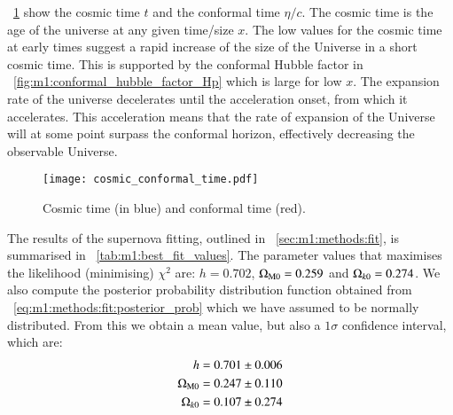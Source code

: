     ~\cref{fig:m1:cosmic_conformal_time} show the cosmic time $t$ and the conformal time $\eta/c$. The cosmic time is the age of the universe at any given time/size $x$. The low values for the cosmic time at early times suggest a rapid increase of the size of the Universe in a short cosmic time. This is supported by the conformal Hubble factor in ~\cref{fig:m1:conformal_hubble_factor_Hp} which is large for low $x$. The expansion rate of the universe decelerates until the acceleration onset, from which it accelerates. This acceleration means that the rate of expansion of the Universe will at some point surpass the conformal horizon, effectively decreasing the observable Universe. 

    \begin{figure}
        \texttt{[image: cosmic\_conformal\_time.pdf]}
        \caption{Cosmic time (in blue) and conformal time (red).}
        \label{fig:m1:cosmic_conformal_time}
    \end{figure}

    The results of the supernova fitting, outlined in ~\cref{sec:m1:methods:fit}, is summarised in ~\cref{tab:m1:best_fit_values}. The parameter values that maximises the likelihood (minimising) $\chi^2$ are: $h=0.702$, $\Omega_\mathrm{M0} = 0.259$ and $\Omega_{k0} = 0.274$. We also compute the posterior probability distribution function obtained from ~\cref{eq:m1:methods:fit:posterior_prob} which we have assumed to be normally distributed. From this we obtain a mean value, but also a $1\sigma$ confidence interval, which are:
    \begin{equation}\label{eq:m1:results:posterior_results}
        \begin{split}
            h &= 0.701\pm0.006 \\
            \Omega_\mathrm{M0} &= 0.247\pm0.110 \\
            \Omega_{k0} &= 0.107 \pm 0.274
        \end{split}
    \end{equation}
    
